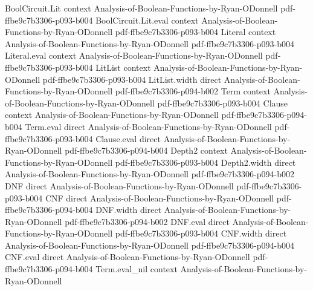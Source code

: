 \begin{lemma}
\leanok
{}
\proofstep
  {BoolCircuit.Lit}
  {context}
  {Analysis-of-Boolean-Functions-by-Ryan-ODonnell}
  {pdf-ffbe9c7b3306-p093-b004}
\proofstep
  {BoolCircuit.Lit.eval}
  {context}
  {Analysis-of-Boolean-Functions-by-Ryan-ODonnell}
  {pdf-ffbe9c7b3306-p093-b004}
\proofstep
  {Literal}
  {context}
  {Analysis-of-Boolean-Functions-by-Ryan-ODonnell}
  {pdf-ffbe9c7b3306-p093-b004}
\proofstep
  {Literal.eval}
  {context}
  {Analysis-of-Boolean-Functions-by-Ryan-ODonnell}
  {pdf-ffbe9c7b3306-p093-b004}
\proofstep
  {LitList}
  {context}
  {Analysis-of-Boolean-Functions-by-Ryan-ODonnell}
  {pdf-ffbe9c7b3306-p093-b004}
\proofstep
  {LitList.width}
  {direct}
  {Analysis-of-Boolean-Functions-by-Ryan-ODonnell}
  {pdf-ffbe9c7b3306-p094-b002}
\proofstep
  {Term}
  {context}
  {Analysis-of-Boolean-Functions-by-Ryan-ODonnell}
  {pdf-ffbe9c7b3306-p093-b004}
\proofstep
  {Clause}
  {context}
  {Analysis-of-Boolean-Functions-by-Ryan-ODonnell}
  {pdf-ffbe9c7b3306-p094-b004}
\proofstep
  {Term.eval}
  {direct}
  {Analysis-of-Boolean-Functions-by-Ryan-ODonnell}
  {pdf-ffbe9c7b3306-p093-b004}
\proofstep
  {Clause.eval}
  {direct}
  {Analysis-of-Boolean-Functions-by-Ryan-ODonnell}
  {pdf-ffbe9c7b3306-p094-b004}
\proofstep
  {Depth2}
  {context}
  {Analysis-of-Boolean-Functions-by-Ryan-ODonnell}
  {pdf-ffbe9c7b3306-p093-b004}
\proofstep
  {Depth2.width}
  {direct}
  {Analysis-of-Boolean-Functions-by-Ryan-ODonnell}
  {pdf-ffbe9c7b3306-p094-b002}
\proofstep
  {DNF}
  {direct}
  {Analysis-of-Boolean-Functions-by-Ryan-ODonnell}
  {pdf-ffbe9c7b3306-p093-b004}
\proofstep
  {CNF}
  {direct}
  {Analysis-of-Boolean-Functions-by-Ryan-ODonnell}
  {pdf-ffbe9c7b3306-p094-b004}
\proofstep
  {DNF.width}
  {direct}
  {Analysis-of-Boolean-Functions-by-Ryan-ODonnell}
  {pdf-ffbe9c7b3306-p094-b002}
\proofstep
  {DNF.eval}
  {direct}
  {Analysis-of-Boolean-Functions-by-Ryan-ODonnell}
  {pdf-ffbe9c7b3306-p093-b004}
\proofstep
  {CNF.width}
  {direct}
  {Analysis-of-Boolean-Functions-by-Ryan-ODonnell}
  {pdf-ffbe9c7b3306-p094-b004}
\proofstep
  {CNF.eval}
  {direct}
  {Analysis-of-Boolean-Functions-by-Ryan-ODonnell}
  {pdf-ffbe9c7b3306-p094-b004}
\proofstep
  {Term.eval_nil}
  {context}
  {Analysis-of-Boolean-Functions-by-Ryan-ODonnell}

\end{lemma}
